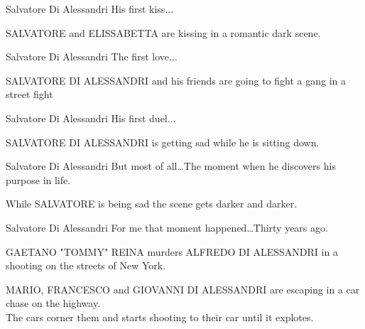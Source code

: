 \documentclass{screenplay}[2020/03/26]
\begin{document}
\begin{dialogue}[narrating]{Salvatore Di Alessandri}
His first kiss...
\end{dialogue}


SALVATORE and ELISSABETTA are kissing in a romantic dark scene.

\begin{dialogue}[narrating]{Salvatore Di Alessandri}
The first love...
\end{dialogue}


\fadeout
{}
SALVATORE DI ALESSANDRI and his friends are going to fight a gang in a street fight

\begin{dialogue}[narrating]{Salvatore Di Alessandri}
His first duel...
\end{dialogue}


\fadein
{}
SALVATORE DI ALESSANDRI is getting sad while he is sitting down.

\begin{dialogue}[narrating]{Salvatore Di Alessandri}
But most of all\dots The moment when he discovers his purpose in life.
\end{dialogue}


\fadeout
{}
While SALVATORE is being sad the scene gets darker and darker.

\begin{dialogue}[narrating]{Salvatore Di Alessandri}
For me that moment happened\dots Thirty years ago.
\end{dialogue}


\fadein
{}
GAETANO "TOMMY" REINA murders ALFREDO DI ALESSANDRI in a shooting on the streets of New York.


\fadeout
{}
MARIO, FRANCESCO and GIOVANNI DI ALESSANDRI are escaping in a car chase on the highway.
\\The cars corner them and starts shooting to their car until it explotes.
\end{document}
